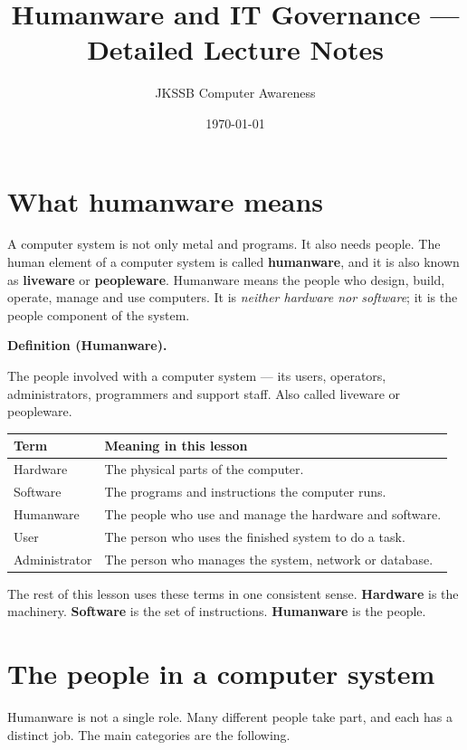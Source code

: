 \documentclass[11pt]{article}
\title{Humanware and IT Governance --- Detailed Lecture Notes}
\author{JKSSB Computer Awareness}
\date{\today}
\newenvironment{definitionbox}[1]{%
  \par\noindent\textbf{Definition (#1).}\ \itshape
}{\par\vspace{0.3em}}
\begin{document}
\maketitle

\section{What humanware means}
A computer system is not only metal and programs. It also needs people. The
human element of a computer system is called \textbf{humanware}, and it is
also known as \textbf{liveware} or \textbf{peopleware}. Humanware means the
people who design, build, operate, manage and use computers. It is
\emph{neither hardware nor software}; it is the people component of the
system.

\begin{definitionbox}{Humanware}
The people involved with a computer system --- its users, operators,
administrators, programmers and support staff. Also called liveware or
peopleware.
\end{definitionbox}

\begin{center}
\begin{tabular}{p{}p{}}
\toprule
\textbf{Term} & \textbf{Meaning in this lesson} \\
\midrule
Hardware & The physical parts of the computer. \\
Software & The programs and instructions the computer runs. \\
Humanware & The people who use and manage the hardware and software. \\
User & The person who uses the finished system to do a task. \\
Administrator & The person who manages the system, network or database. \\
\bottomrule
\end{tabular}
\end{center}

The rest of this lesson uses these terms in one consistent sense.
\textbf{Hardware} is the machinery. \textbf{Software} is the set of
instructions. \textbf{Humanware} is the people.

\section{The people in a computer system}
Humanware is not a single role. Many different people take part, and each has
a distinct job. The main categories are the following.
\end{document}
